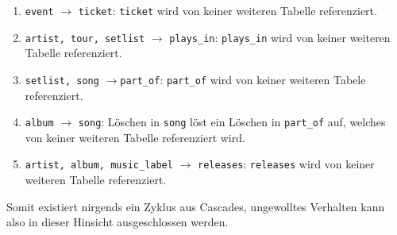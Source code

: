 \documentclass[12pt, oneside, a4paper]{article}
\begin{document}
\begin{enumerate}
	\item \texttt{event} $\rightarrow$ \texttt{ticket}: \texttt{ticket} wird von keiner weiteren Tabelle referenziert.
	\item \texttt{artist, tour, setlist} $\rightarrow$ \texttt{plays\_in}: \texttt{plays\_in} wird von keiner weiteren Tabelle referenziert.
	\item \texttt{setlist, song} $\rightarrow $\texttt{part\_of}: \texttt{part\_of} wird von keiner weiteren Tabele referenziert.
	\item \texttt{album} $\rightarrow$ \texttt{song}: Löschen in \texttt{song} löst ein Löschen in \texttt{part\_of} auf, welches von keiner weiteren Tabelle referenziert wird.
	\item \texttt{artist, album, music\_label} $\rightarrow$ \texttt{releases}: \texttt{releases} wird von keiner weiteren Tabelle referenziert.
\end{enumerate}

Somit existiert nirgends ein Zyklus aus Cascades, ungewolltes Verhalten kann also in dieser Hinsicht ausgeschlossen werden.
\end{document}
